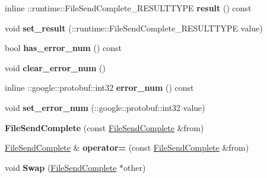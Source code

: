 \begin{DoxyCompactItemize}
inline \+::runtime\+::\+File\+Send\+Complete\+\_\+\+R\+E\+S\+U\+L\+T\+T\+Y\+PE {\bfseries result} () const
\item 
\mbox{\label{classruntime_1_1FileSendComplete_a2e5624714c948f022e18e8ba82adcb49}} 
void {\bfseries set\+\_\+result} (\+::runtime\+::\+File\+Send\+Complete\+\_\+\+R\+E\+S\+U\+L\+T\+T\+Y\+PE value)
\item 
\mbox{\label{classruntime_1_1FileSendComplete_a61dfd7b49b2e7362e7d171765d2847c0}} 
bool {\bfseries has\+\_\+error\+\_\+num} () const
\item 
\mbox{\label{classruntime_1_1FileSendComplete_a8b7a9816993560c929e53e1eacf8cf4d}} 
void {\bfseries clear\+\_\+error\+\_\+num} ()
\item 
\mbox{\label{classruntime_1_1FileSendComplete_a437b23ea83f08316c27e09e478f0b6f0}} 
inline \+::google\+::protobuf\+::int32 {\bfseries error\+\_\+num} () const
\item 
\mbox{\label{classruntime_1_1FileSendComplete_a95e3393fd9db38e948231acc60650b1e}} 
void {\bfseries set\+\_\+error\+\_\+num} (\+::google\+::protobuf\+::int32 value)
\item 
\mbox{\label{classruntime_1_1FileSendComplete_a21bd78bbf6d5d57a3f66ee0f8a5fefe3}} 
{\bfseries File\+Send\+Complete} (const \hyperlink{classruntime_1_1FileSendComplete}{File\+Send\+Complete} \&from)
\item 
\mbox{\label{classruntime_1_1FileSendComplete_a5590cf029544a87a8532aa06867e7492}} 
\hyperlink{classruntime_1_1FileSendComplete}{File\+Send\+Complete} \& {\bfseries operator=} (const \hyperlink{classruntime_1_1FileSendComplete}{File\+Send\+Complete} \&from)
\item 
\mbox{\label{classruntime_1_1FileSendComplete_aa583c6ec35602d313f8c05bce5481e4e}} 
void {\bfseries Swap} (\hyperlink{classruntime_1_1FileSendComplete}{File\+Send\+Complete} $\ast$other)
\item 
\mbox{\label{classruntime_1_1FileSendComplete_ad2b5a7c36c500dfd208e0c01eecdacd9}} 

\end{DoxyCompactItemize}
